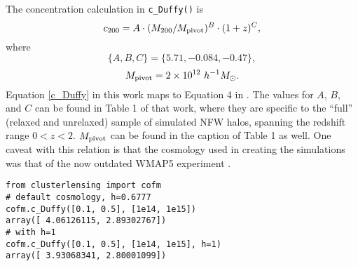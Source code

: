 \documentclass{emulateapj}
\newcommand{\code}{\lstinline[style=codeintext]}
\begin{document}
The concentration calculation in \code{c_Duffy()} is
\begin{equation}\label{c_Duffy}
c_{200} = A \cdot (M_{200} / M_{\rm pivot})^B \cdot (1 + z)^C,
\end{equation}
where
\begin{equation}
\{A, B, C\} = \{5.71, -0.084, -0.47\},
\end{equation}
\begin{equation}
M_{\rm pivot} = 2 \times 10^{12}\ h^{-1} M_{\odot}.
\end{equation}
Equation \ref{c_Duffy} in this work maps to Equation 4 in \citet{Duffy08}. The values for $A$, $B$, and $C$ can be found in Table 1 of that work, where they are specific to the ``full'' (relaxed and unrelaxed) sample of simulated NFW halos, spanning the redshift range $0 < z < 2$. $M_{\rm pivot}$ can be found in the caption of Table 1 as well. One caveat with this relation is that the cosmology used in creating the \citet{Duffy08} simulations was that of the now outdated WMAP5 experiment \citep{WMAP5}.

\begin{lstlisting}
from clusterlensing import cofm
# default cosmology, h=0.6777
cofm.c_Duffy([0.1, 0.5], [1e14, 1e15])
array([ 4.06126115, 2.89302767])
# with h=1
cofm.c_Duffy([0.1, 0.5], [1e14, 1e15], h=1)
array([ 3.93068341, 2.80001099])
\end{lstlisting}
\end{document}
